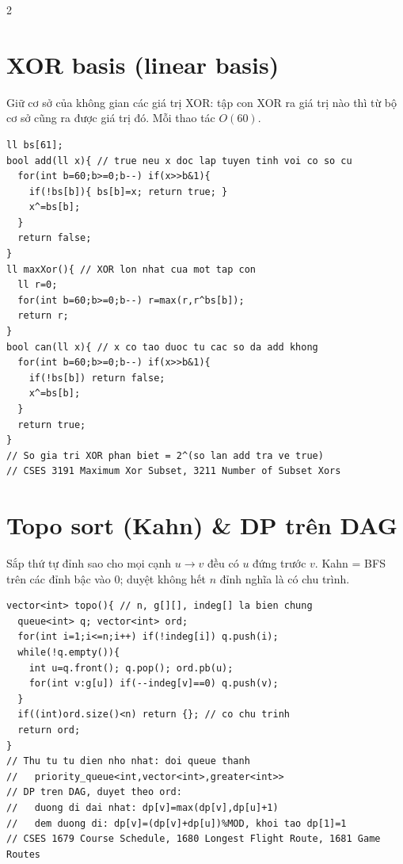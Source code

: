 \documentclass[8pt]{extarticle}
\begin{document}
\begin{multicols}{2}
\section{XOR basis (linear basis)}
Giữ cơ sở của không gian các giá trị XOR: tập con XOR ra giá trị nào thì từ bộ cơ sở cũng ra được giá trị đó. Mỗi thao tác $O(60)$.
\begin{lstlisting}
ll bs[61];
bool add(ll x){ // true neu x doc lap tuyen tinh voi co so cu
  for(int b=60;b>=0;b--) if(x>>b&1){
    if(!bs[b]){ bs[b]=x; return true; }
    x^=bs[b];
  }
  return false;
}
ll maxXor(){ // XOR lon nhat cua mot tap con
  ll r=0;
  for(int b=60;b>=0;b--) r=max(r,r^bs[b]);
  return r;
}
bool can(ll x){ // x co tao duoc tu cac so da add khong
  for(int b=60;b>=0;b--) if(x>>b&1){
    if(!bs[b]) return false;
    x^=bs[b];
  }
  return true;
}
// So gia tri XOR phan biet = 2^(so lan add tra ve true)
// CSES 3191 Maximum Xor Subset, 3211 Number of Subset Xors
\end{lstlisting}

\section{Topo sort (Kahn) \& DP trên DAG}
Sắp thứ tự đỉnh sao cho mọi cạnh $u\to v$ đều có $u$ đứng trước $v$. Kahn = BFS trên các đỉnh bậc vào 0; duyệt không hết $n$ đỉnh nghĩa là có chu trình.
\begin{lstlisting}
vector<int> topo(){ // n, g[][], indeg[] la bien chung
  queue<int> q; vector<int> ord;
  for(int i=1;i<=n;i++) if(!indeg[i]) q.push(i);
  while(!q.empty()){
    int u=q.front(); q.pop(); ord.pb(u);
    for(int v:g[u]) if(--indeg[v]==0) q.push(v);
  }
  if((int)ord.size()<n) return {}; // co chu trinh
  return ord;
}
// Thu tu tu dien nho nhat: doi queue thanh
//   priority_queue<int,vector<int>,greater<int>>
// DP tren DAG, duyet theo ord:
//   duong di dai nhat: dp[v]=max(dp[v],dp[u]+1)
//   dem duong di: dp[v]=(dp[v]+dp[u])%MOD, khoi tao dp[1]=1
// CSES 1679 Course Schedule, 1680 Longest Flight Route, 1681 Game Routes
\end{lstlisting}


\end{multicols}
\end{document}
